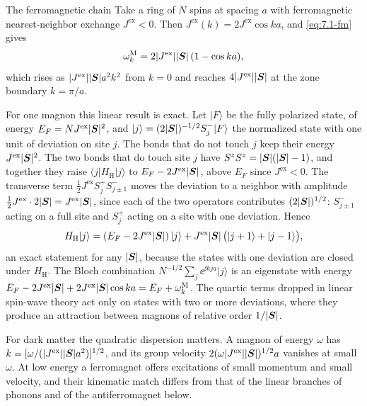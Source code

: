 \begin{workedexample}{The ferromagnetic chain}\label{we:7-chain}
Take a ring of $N$ spins at spacing $a$ with ferromagnetic nearest-neighbor exchange $J^{\mathrm{ex}} < 0$. Then $J^{\mathrm{ex}}(k) = 2J^{\mathrm{ex}}\cos ka$, and \cref{eq:7.1-fm} gives
\begin{equation*}
  \omega^{\mathrm{M}}_k = 2|J^{\mathrm{ex}}||\bm{S}|\,(1 - \cos ka) ,
\end{equation*}
which rises as $|J^{\mathrm{ex}}||\bm{S}|a^2k^2$ from $k = 0$ and reaches $4|J^{\mathrm{ex}}||\bm{S}|$ at the zone boundary $k = \pi/a$.

For one magnon this linear result is exact. Let $|F\rangle$ be the fully polarized state, of energy $E_F = NJ^{\mathrm{ex}}|\bm{S}|^2$, and $|j\rangle = (2|\bm{S}|)^{-1/2}S^-_j|F\rangle$ the normalized state with one unit of deviation on site $j$. The bonds that do not touch $j$ keep their energy $J^{\mathrm{ex}}|\bm{S}|^2$. The two bonds that do touch site $j$ have $S^zS^z = |\bm{S}|(|\bm{S}| - 1)$, and together they raise $\langle j|H_{\mathrm{H}}|j\rangle$ to $E_F - 2J^{\mathrm{ex}}|\bm{S}|$, above $E_F$ since $J^{\mathrm{ex}} < 0$. The transverse term $\frac12J^{\mathrm{ex}}S^+_jS^-_{j\pm1}$ moves the deviation to a neighbor with amplitude $\frac12J^{\mathrm{ex}}\cdot2|\bm{S}| = J^{\mathrm{ex}}|\bm{S}|$, since each of the two operators contributes $(2|\bm{S}|)^{1/2}$: $S^-_{j\pm1}$ acting on a full site and $S^+_j$ acting on a site with one deviation. Hence
\begin{equation*}
  H_{\mathrm{H}}|j\rangle = (E_F - 2J^{\mathrm{ex}}|\bm{S}|)\,|j\rangle + J^{\mathrm{ex}}|\bm{S}|\,\bigl(|j + 1\rangle + |j - 1\rangle\bigr) ,
\end{equation*}
an exact statement for any $|\bm{S}|$, because the states with one deviation are closed under $H_{\mathrm{H}}$. The Bloch combination $N^{-1/2}\sum_j\ee^{\ii kja}|j\rangle$ is an eigenstate with energy $E_F - 2J^{\mathrm{ex}}|\bm{S}| + 2J^{\mathrm{ex}}|\bm{S}|\cos ka = E_F + \omega^{\mathrm{M}}_k$. The quartic terms dropped in linear spin-wave theory act only on states with two or more deviations, where they produce an attraction between magnons of relative order $1/|\bm{S}|$.

For dark matter the quadratic dispersion matters. A magnon of energy $\omega$ has $k = [\omega/(|J^{\mathrm{ex}}||\bm{S}|a^2)]^{1/2}$, and its group velocity $2(\omega|J^{\mathrm{ex}}||\bm{S}|)^{1/2}a$ vanishes at small $\omega$. At low energy a ferromagnet offers excitations of small momentum and small velocity, and their kinematic match differs from that of the linear branches of phonons and of the antiferromagnet below.
\end{workedexample}

